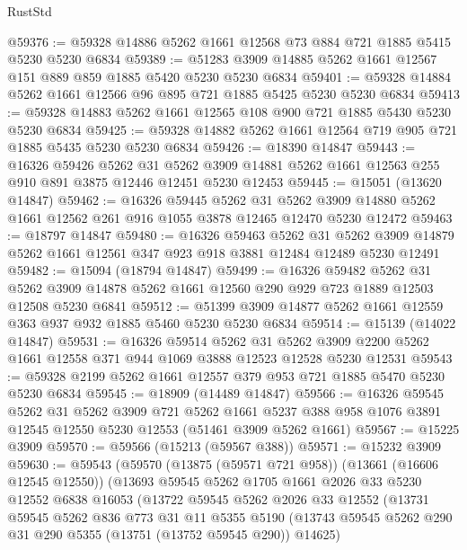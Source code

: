 \begin{lexlean}{RustStd}
\begin{coremodule}
@59376 := @59328 @14886 @5262 @1661 @12568 @73 @884 @721 @1885 @5415 @5230 @5230 @6834
@59389 := @51283 @3909 @14885 @5262 @1661 @12567 @151 @889 @859 @1885 @5420 @5230 @5230 @6834
@59401 := @59328 @14884 @5262 @1661 @12566 @96 @895 @721 @1885 @5425 @5230 @5230 @6834
@59413 := @59328 @14883 @5262 @1661 @12565 @108 @900 @721 @1885 @5430 @5230 @5230 @6834
@59425 := @59328 @14882 @5262 @1661 @12564 @719 @905 @721 @1885 @5435 @5230 @5230 @6834
@59426 := @18390 @14847
@59443 := @16326
    @59426
    @5262
    @31
    @5262
    @3909
    @14881
    @5262
    @1661
    @12563
    @255
    @910
    @891
    @3875
    @12446
    @12451
    @5230
    @12453
@59445 := @15051 (@13620 @14847)
@59462 := @16326
    @59445
    @5262
    @31
    @5262
    @3909
    @14880
    @5262
    @1661
    @12562
    @261
    @916
    @1055
    @3878
    @12465
    @12470
    @5230
    @12472
@59463 := @18797 @14847
@59480 := @16326
    @59463
    @5262
    @31
    @5262
    @3909
    @14879
    @5262
    @1661
    @12561
    @347
    @923
    @918
    @3881
    @12484
    @12489
    @5230
    @12491
@59482 := @15094 (@18794 @14847)
@59499 := @16326
    @59482
    @5262
    @31
    @5262
    @3909
    @14878
    @5262
    @1661
    @12560
    @290
    @929
    @723
    @1889
    @12503
    @12508
    @5230
    @6841
@59512 := @51399 @3909 @14877 @5262 @1661 @12559 @363 @937 @932 @1885 @5460 @5230 @5230 @6834
@59514 := @15139 (@14022 @14847)
@59531 := @16326
    @59514
    @5262
    @31
    @5262
    @3909
    @2200
    @5262
    @1661
    @12558
    @371
    @944
    @1069
    @3888
    @12523
    @12528
    @5230
    @12531
@59543 := @59328 @2199 @5262 @1661 @12557 @379 @953 @721 @1885 @5470 @5230 @5230 @6834
@59545 := @18909 (@14489 @14847)
@59566 := @16326
    @59545
    @5262
    @31
    @5262
    @3909
    @721
    @5262
    @1661
    @5237
    @388
    @958
    @1076
    @3891
    @12545
    @12550
    @5230
    @12553
    (@51461 @3909 @5262 @1661)
@59567 := @15225 @3909
@59570 := @59566 (@15213 (@59567 @388))
@59571 := @15232 @3909
@59630 := @59543
    (@59570
      (@13875 (@59571 @721 @958))
      (@13661 (@16606 @12545 @12550))
      (@13693
        @59545
        @5262
        @1705
        @1661
        @2026
        @33
        @5230
        @12552
        @6838
        @16053
        (@13722
          @59545
          @5262
          @2026
          @33
          @12552
          (@13731
            @59545
            @5262
            @836
            @773
            @31
            @11
            @5355
            @5190
            (@13743 @59545 @5262 @290 @31 @290 @5355 (@13751 (@13752 @59545 @290)) @14625)

\end{coremodule}
\end{lexlean}
